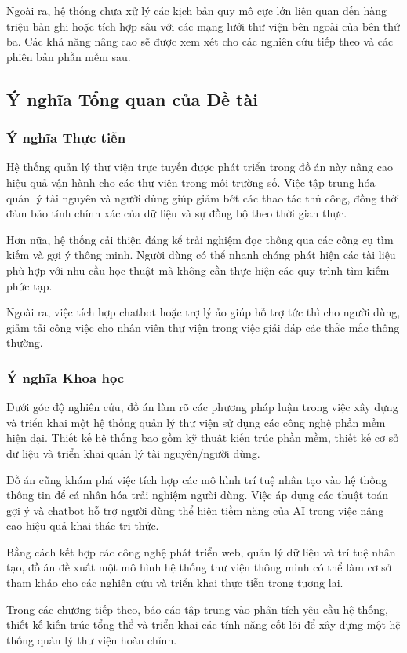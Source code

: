 Ngoài ra, hệ thống chưa xử lý các kịch bản quy mô cực lớn liên quan đến hàng triệu bản ghi hoặc tích hợp sâu với các mạng lưới thư viện bên ngoài của bên thứ ba. Các khả năng nâng cao sẽ được xem xét cho các nghiên cứu tiếp theo và các phiên bản phần mềm sau.

\subsection{Ý nghĩa Tổng quan của Đề tài}

\subsubsection{Ý nghĩa Thực tiễn}

Hệ thống quản lý thư viện trực tuyến được phát triển trong đồ án này nâng cao hiệu quả vận hành cho các thư viện trong môi trường số. Việc tập trung hóa quản lý tài nguyên và người dùng giúp giảm bớt các thao tác thủ công, đồng thời đảm bảo tính chính xác của dữ liệu và sự đồng bộ theo thời gian thực.

Hơn nữa, hệ thống cải thiện đáng kể trải nghiệm đọc thông qua các công cụ tìm kiếm và gợi ý thông minh. Người dùng có thể nhanh chóng phát hiện các tài liệu phù hợp với nhu cầu học thuật mà không cần thực hiện các quy trình tìm kiếm phức tạp.

Ngoài ra, việc tích hợp chatbot hoặc trợ lý ảo giúp hỗ trợ tức thì cho người dùng, giảm tải công việc cho nhân viên thư viện trong việc giải đáp các thắc mắc thông thường.

\subsubsection{Ý nghĩa Khoa học}

Dưới góc độ nghiên cứu, đồ án làm rõ các phương pháp luận trong việc xây dựng và triển khai một hệ thống quản lý thư viện sử dụng các công nghệ phần mềm hiện đại. Thiết kế hệ thống bao gồm kỹ thuật kiến trúc phần mềm, thiết kế cơ sở dữ liệu và triển khai quản lý tài nguyên/người dùng.

Đồ án cũng khám phá việc tích hợp các mô hình trí tuệ nhân tạo vào hệ thống thông tin để cá nhân hóa trải nghiệm người dùng. Việc áp dụng các thuật toán gợi ý và chatbot hỗ trợ người dùng thể hiện tiềm năng của AI trong việc nâng cao hiệu quả khai thác tri thức.

Bằng cách kết hợp các công nghệ phát triển web, quản lý dữ liệu và trí tuệ nhân tạo, đồ án đề xuất một mô hình hệ thống thư viện thông minh có thể làm cơ sở tham khảo cho các nghiên cứu và triển khai thực tiễn trong tương lai.

Trong các chương tiếp theo, báo cáo tập trung vào phân tích yêu cầu hệ thống, thiết kế kiến trúc tổng thể và triển khai các tính năng cốt lõi để xây dựng một hệ thống quản lý thư viện hoàn chỉnh.